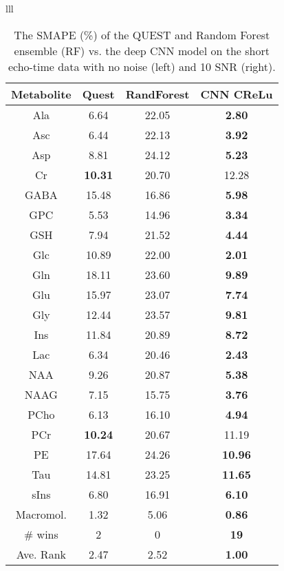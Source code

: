 \documentclass{llncs}
\begin{document}
\begin{table*}
\tiny
\caption{The SMAPE (\%) of the QUEST and Random Forest ensemble (RF) vs. the deep CNN model on the short echo-time data with no noise (left) and 10 SNR (right).}

\begin{center}
\begin{tabular}{lll}
\begin{tabular}{c c c c}
\hline
Metabolite & Quest & RandForest & CNN CReLu\\[2pt]
\hline\rule{0pt}{12pt}
Ala	 &       6.64      & 22.05 	& \bf 2.80 	\\
Asc      &       6.44      & 22.13 	& \bf 3.92 	\\
Asp      &       8.81      & 24.12 	& \bf 5.23 	\\
Cr       & \bf   10.31     & 20.70 	&     12.28 	\\
GABA     &       15.48     & 16.86 	& \bf 5.98 	\\
GPC      &       5.53      & 14.96 	& \bf 3.34 	\\
GSH      &       7.94      & 21.52 	& \bf 4.44 	\\
Glc      &       10.89     & 22.00 	& \bf 2.01 	\\
Gln      &       18.11     & 23.60 	& \bf 9.89 	\\
Glu      &       15.97     & 23.07 	& \bf 7.74 	\\
Gly      &       12.44     & 23.57 	& \bf 9.81 	\\
Ins      &       11.84     & 20.89 	& \bf 8.72 	\\
Lac      &       6.34      & 20.46 	& \bf 2.43 	\\
NAA      &       9.26      & 20.87 	& \bf 5.38 	\\
NAAG     &       7.15      & 15.75 	& \bf 3.76 	\\
PCho     &       6.13      & 16.10 	& \bf 4.94 	\\
PCr      &  \bf  10.24     & 20.67 	&     11.19 	\\
PE       &       17.64     & 24.26 	& \bf 10.96 	\\
Tau      &       14.81     & 23.25 	& \bf 11.65 	\\
sIns     &       6.80      & 16.91 	& \bf 6.10 	\\
\hdashline   
Macromol.&       1.32      & 5.06 	& \bf 0.86 	\\
[2pt]
\hline
\# wins   & 2              & 0          & \bf 19 \\
Ave. Rank & 2.47           & 2.52       &  \bf 1.00 \\ %

\end{tabular}
\end{tabular}
\end{center}
\end{table*}
\end{document}
